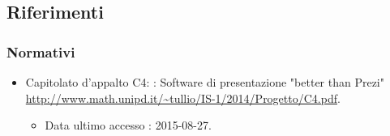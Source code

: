 \subsection{Riferimenti}
\subsubsection{Normativi}

\begin{itemize}
	\item Capitolato d'appalto C4: \PROGETTO: Software di presentazione "better than Prezi" \\ \url{http://www.math.unipd.it/~tullio/IS-1/2014/Progetto/C4.pdf}.
	\begin{itemize}
		\item Data ultimo accesso : 2015-08-27.						
	\end{itemize}
\end{itemize}

